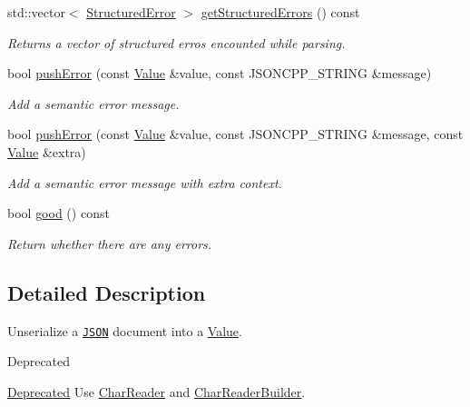 \begin{DoxyCompactItemize}
std\+::vector$<$ \hyperlink{structJson_1_1Reader_1_1StructuredError}{Structured\+Error} $>$ \hyperlink{classJson_1_1Reader_ae3d714e95bd98b27e296c607e408189b}{get\+Structured\+Errors} () const
\begin{DoxyCompactList}\small\item\em Returns a vector of structured erros encounted while parsing. \end{DoxyCompactList}\item 
bool \hyperlink{classJson_1_1Reader_af5fa7099083f01706635ade1d0f8ddb5}{push\+Error} (const \hyperlink{classJson_1_1Value}{Value} \&value, const J\+S\+O\+N\+C\+P\+P\+\_\+\+S\+T\+R\+I\+NG \&message)
\begin{DoxyCompactList}\small\item\em Add a semantic error message. \end{DoxyCompactList}\item 
bool \hyperlink{classJson_1_1Reader_a3568be9db568ff57bd3fcc373143dff3}{push\+Error} (const \hyperlink{classJson_1_1Value}{Value} \&value, const J\+S\+O\+N\+C\+P\+P\+\_\+\+S\+T\+R\+I\+NG \&message, const \hyperlink{classJson_1_1Value}{Value} \&extra)
\begin{DoxyCompactList}\small\item\em Add a semantic error message with extra context. \end{DoxyCompactList}\item 
bool \hyperlink{classJson_1_1Reader_a86cbb42b3e6d4a4d6416473b1a8f6ae7}{good} () const
\begin{DoxyCompactList}\small\item\em Return whether there are any errors. \end{DoxyCompactList}\end{DoxyCompactItemize}


\subsection{Detailed Description}
Unserialize a \href{http://www.json.org}{\tt J\+S\+ON} document into a \hyperlink{classJson_1_1Value}{Value}. 

\begin{DoxyRefDesc}{Deprecated}
\item[\hyperlink{deprecated__deprecated000005}{Deprecated}]Use \hyperlink{classJson_1_1CharReader}{Char\+Reader} and \hyperlink{classJson_1_1CharReaderBuilder}{Char\+Reader\+Builder}. \end{DoxyRefDesc}



